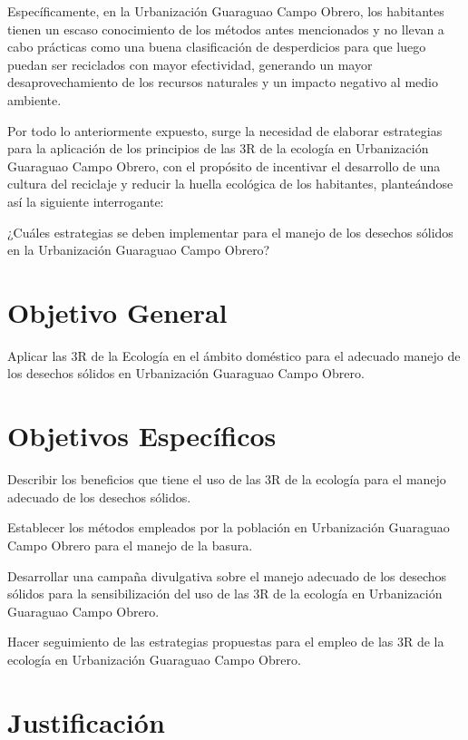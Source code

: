 Específicamente, en la Urbanización Guaraguao Campo Obrero, los habitantes tienen un escaso conocimiento de los métodos antes mencionados y no llevan a cabo prácticas como una buena clasificación de desperdicios para que luego puedan ser reciclados con mayor efectividad, generando un mayor desaprovechamiento de los recursos naturales y un impacto negativo al medio ambiente. 

Por todo lo anteriormente expuesto, surge la necesidad de elaborar estrategias para la aplicación de los principios de las 3R de la ecología en Urbanización Guaraguao Campo Obrero, con el propósito de incentivar el desarrollo de una cultura del reciclaje y reducir la huella ecológica de los habitantes, planteándose así la siguiente interrogante:

¿Cuáles estrategias se deben implementar para el manejo de los desechos sólidos en la Urbanización Guaraguao Campo Obrero?

\newpage

\section{Objetivo General}

Aplicar las 3R de la Ecología en el ámbito doméstico para el adecuado manejo de los desechos sólidos en Urbanización Guaraguao Campo Obrero.

\section{Objetivos Específicos}

Describir los beneficios que tiene el uso de las 3R de la ecología para el manejo adecuado de los desechos sólidos.

Establecer los métodos empleados por la población en Urbanización Guaraguao Campo Obrero para el manejo de la basura.

Desarrollar una campaña divulgativa sobre el manejo adecuado de los desechos sólidos para la sensibilización del uso de las 3R de la ecología en Urbanización Guaraguao Campo Obrero.

Hacer seguimiento de las estrategias propuestas para el empleo de las 3R de la ecología en Urbanización Guaraguao Campo Obrero.

\newpage

\section{Justificación}

